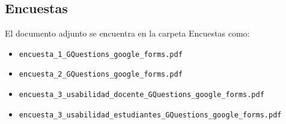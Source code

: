 \documentclass[../Main.tex]{subfiles}
\begin{document}
\subsection*{Encuestas}
\begin{justify}
El documento adjunto se encuentra en la carpeta Encuestas como:
\begin{itemize}
    \item \texttt{encuesta\_1\_GQuestions\_google\_forms.pdf}
    \item \texttt{encuesta\_2\_GQuestions\_google\_forms.pdf}
    \item \texttt{encuesta\_3\_usabilidad\_docente\_GQuestions\_google\_forms.pdf}
    \item \texttt{encuesta\_3\_usabilidad\_estudiantes\_GQuestions\_google\_forms.pdf}
\end{itemize}
\end{justify}
\end{document}
